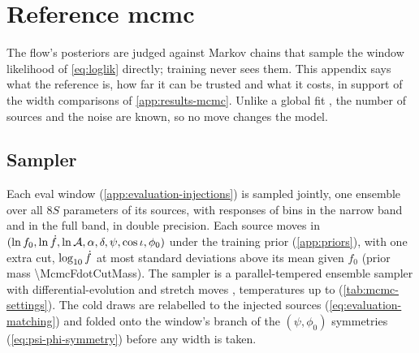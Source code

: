\section{Reference \acs{mcmc}}
\label{app:mcmc}

The flow's posteriors are judged against Markov chains that sample the window likelihood of
\cref{eq:loglik} directly; training never sees them. This appendix says what the reference is, how far it
can be trusted and what it costs, in support of the width comparisons of \cref{app:results-mcmc}. Unlike a
global fit \citep{littenberg2020global}, the number of sources and the noise are known, so no move changes
the model.

\subsection{Sampler}
\label{app:mcmc-sampler}

Each eval window (\cref{app:evaluation-injections}) is sampled jointly, one ensemble over all $8S$
parameters of its sources, with responses of \PriorsNarrowR{} bins in the narrow band and \PriorsFullR{} in
the full band, in double precision. Each source moves in
$(\ln f_0, \ln\dot f, \ln\mathcal{A}, \alpha, \delta, \psi, \cos\iota, \phi_0)$ under the training prior
(\cref{app:priors}), with one extra cut, $\log_{10}\dot f$ at most \McmcFdotSigmas{} standard
deviations above its mean given $f_0$ (prior mass \num{\McmcFdotCutMass}). The sampler is a
parallel-tempered ensemble sampler with differential-evolution \citep{terbraak2006markov} and
stretch moves \citep{goodman2010ensemble,foreman2013emcee}, \McmcTemps{} temperatures up to
\McmcTempMax{} \citep{vousden2016dynamic} (\cref{tab:mcmc-settings}). The cold draws are relabelled to the
injected sources (\cref{eq:evaluation-matching}) and folded onto the window's branch of the
$(\psi,\phi_0)$ symmetries (\cref{eq:psi-phi-symmetry}) before any width is taken.

